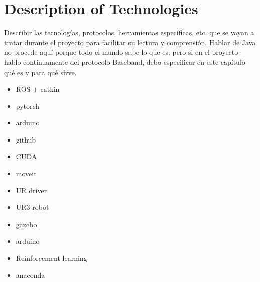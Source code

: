 \chapter{Description of Technologies}
	Describir las tecnologías, protocolos, herramientas específicas, etc. que se vayan a tratar durante el proyecto para facilitar su lectura y comprensión.
	Hablar de Java no procede aquí porque todo el mundo sabe lo que es, pero si en el proyecto hablo continuamente del protocolo Baseband, debo especificar en este capítulo qué es y para qué sirve.

	\begin{itemize}
	\item[\textendash]ROS + catkin  %
	\item[\textendash]pytorch
	\item[\textendash]arduino
	\item[\textendash]github
	\item[\textendash]CUDA
	\item[\textendash]moveit
	\item[\textendash]UR driver	
	\item[\textendash]UR3 robot
	\item[\textendash]gazebo
	\item[\textendash]arduino
	\item[\textendash]Reinforcement learning %
	\item[\textendash]anaconda
	\end{itemize}
	
